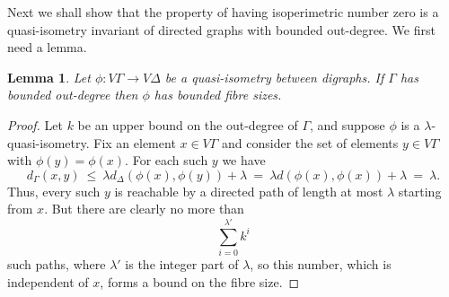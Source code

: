 \documentclass[11pt,a4paper,reqno]{amsart}
\newtheorem{lemma}[theorem]{Lemma}
\begin{document}
Next we shall show that the property of having isoperimetric number zero is a quasi-isometry invariant of directed graphs with bounded out-degree. We first need a lemma. 

\begin{lemma}\label{lem_const}
Let $\phi: V \Gamma \rightarrow V \Delta$ be a quasi-isometry between
digraphs. If $\Gamma$ has bounded out-degree then $\phi$ has bounded
fibre sizes.
\end{lemma}
\begin{proof}
Let $k$ be an upper bound on the out-degree of $\Gamma$, and suppose
$\phi$ is a $\lambda$-quasi-isometry. Fix an element $x \in V \Gamma$ and
consider the set of elements $y \in V \Gamma$ with $\phi(y) = \phi(x)$.
For each such $y$ we have
$$d_\Gamma(x,y) \ \leq \ \lambda d_\Delta(\phi(x),\phi(y)) + \lambda \ = \ \lambda d(\phi(x),\phi(x)) + \lambda \ = \ \lambda.$$
Thus, every such $y$ is reachable by a directed path of length
at most $\lambda$ starting from $x$. But there are clearly no more than
$$\sum_{i=0}^{\lambda'} k^i$$
such paths, where $\lambda'$ is the integer part of $\lambda$, so this number, which
is independent of $x$, forms a bound on the fibre size.
\end{proof}
\end{document}
